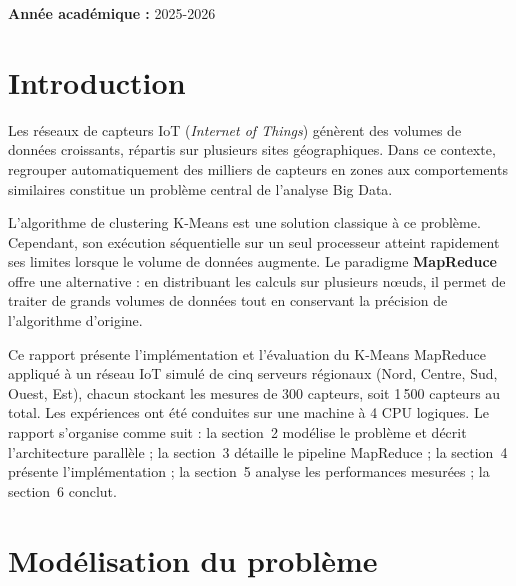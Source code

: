 \documentclass[12pt,a4paper]{article}
\begin{document}
\begin{titlepage}
\begin{center}
\vfill

\textbf{Année académique :} 2025-2026

\end{center}
\end{titlepage}

{\singlespacing
\tableofcontents
}
\newpage

\section{Introduction}

Les réseaux de capteurs IoT (\textit{Internet of Things}) génèrent des volumes de données
croissants, répartis sur plusieurs sites géographiques. Dans ce contexte, regrouper
automatiquement des milliers de capteurs en zones aux comportements similaires constitue
un problème central de l'analyse Big Data.

L'algorithme de clustering K-Means est une solution classique à ce problème. Cependant,
son exécution séquentielle sur un seul processeur atteint rapidement ses limites lorsque
le volume de données augmente. Le paradigme \textbf{MapReduce} offre une alternative :
en distribuant les calculs sur plusieurs nœuds, il permet de traiter de grands volumes
de données tout en conservant la précision de l'algorithme d'origine.

Ce rapport présente l'implémentation et l'évaluation du K-Means MapReduce appliqué à
un réseau IoT simulé de cinq serveurs régionaux (Nord, Centre, Sud, Ouest, Est),
chacun stockant les mesures de 300 capteurs, soit 1\,500 capteurs au total.
Les expériences ont été conduites sur une machine à 4 CPU logiques. Le rapport
s'organise comme suit : la section~2 modélise le problème et décrit l'architecture
parallèle ; la section~3 détaille le pipeline MapReduce ; la section~4 présente
l'implémentation ; la section~5 analyse les performances mesurées ; la section~6 conclut.

\section{Modélisation du problème}
\end{document}
